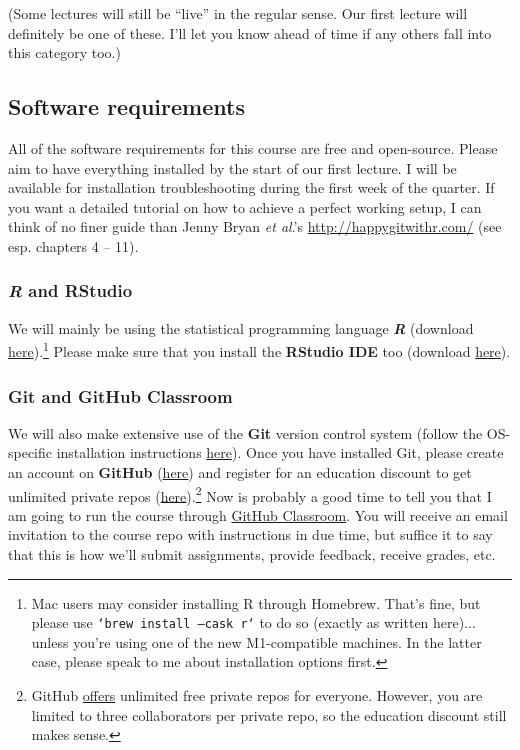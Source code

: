 \documentclass[12]{article}
\begin{document}
(Some lectures will still be ``live'' in the regular sense. Our first lecture
will definitely be one of these. I'll let you know ahead of time if any others
fall into this category too.)

\subsection*{Software requirements}

All of the software requirements for this course are free and open-source.
Please aim to have everything installed by the start of our first lecture. I
will be available for installation troubleshooting during the first week of the
quarter. If you want a detailed tutorial on how to achieve a perfect working
setup, I can think of no finer guide than Jenny Bryan \textit{et al}.'s
\url{http://happygitwithr.com/} (see esp. chapters 4 -- 11).

\vspace{-0.25cm}
\subsubsection*{\textit{R} and RStudio}

We will mainly be using the statistical programming language \textbf{\textit{R}}
(download \href{https://www.r-project.org/}{here}).\footnote{Mac users may
consider installing R through Homebrew. That's fine, but please use \texttt{`brew
install --cask r`} to do so (exactly as written here)... unless you're using one 
of the new M1-compatible machines. In the latter case, please speak to me about
installation options first.} 
Please make sure that you install the \textbf{RStudio IDE} too (download
\href{https://www.rstudio.com/products/rstudio/download/preview/}{here}).

\vspace{-0.25cm}
\subsubsection*{Git and GitHub Classroom}

We will also make extensive use of the \textbf{Git} version control system
(follow the OS-specific installation instructions
\href{http://happygitwithr.com/install-git.html}{here}). Once you have installed
Git, please create an account on \textbf{GitHub}
(\href{https://github.com/join}{here}) and register for an education discount to
get unlimited private repos
(\href{https://education.github.com/discount_requests/new}{here}).\footnote{GitHub
\href{https://blog.github.com/changelog/2019-01-08-pricing-changes/}{offers}
unlimited free private repos for everyone. However, you are limited to three
collaborators per private repo, so the education discount still makes sense.}
Now is probably a good time to tell you that I am going to run the course
through \href{https://classroom.github.com/}{GitHub Classroom}. You will receive
an email invitation to the course repo with instructions in due time, but
suffice it to say that this is how we'll submit assignments, provide feedback,
receive grades, etc.
\end{document}
